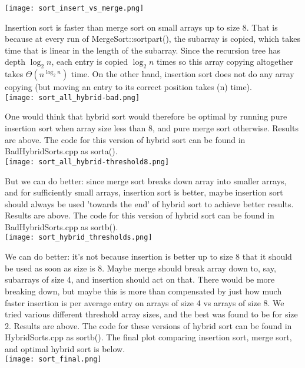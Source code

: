 \documentclass[a4paper]{article}
\begin{document}
\texttt{[image: sort\_insert\_vs\_merge.png]}

Insertion sort is faster than merge sort on small arrays up to size 8.
That is because at every run of MergeSort::sortpart(), the subarray is copied, which takes time that is linear in the length of the subarray. Since the recursion tree has depth $\log_2 n$, each entry is copied $\log_2 n$ times so this array copying altogether takes $\Theta(n^{\log_2 n})$ time. On the other hand, insertion sort does not do any array copying (but moving an entry to its correct position takes (n) time).\\

\texttt{[image: sort\_all\_hybrid-bad.png]}

One would think that hybrid sort would therefore be optimal by running pure insertion sort when array size less than 8, and pure merge sort otherwise. Results are above. The code for this version of hybrid sort can be found in BadHybridSorts.cpp as sorta().\\

\texttt{[image: sort\_all\_hybrid-threshold8.png]}

But we can do better: since merge sort breaks down array into smaller arrays, and for sufficiently small arrays, insertion sort is better, maybe insertion sort should always be used 'towards the end' of hybrid sort to achieve better results. Results are above. The code for this version of hybrid sort can be found in BadHybridSorts.cpp as sortb().\\

\texttt{[image: sort\_hybrid\_thresholds.png]}

We can do better: it's not because insertion is better up to size 8 that it should be used as soon as size is 8. Maybe merge should break array down to, say, subarrays of size 4, and insertion should act on that. There would be more breaking down, but maybe this is more than compensated by just how much faster insertion is per average entry on arrays of size 4 vs arrays of size 8. We tried various different threshold array sizes, and the best was found to be for size 2. Results are above. The code for these versions of hybrid sort can be found in HybridSorts.cpp as sortb(). The final plot comparing insertion sort, merge sort, and optimal hybrid sort is below. \\

\texttt{[image: sort\_final.png]}
\end{document}
